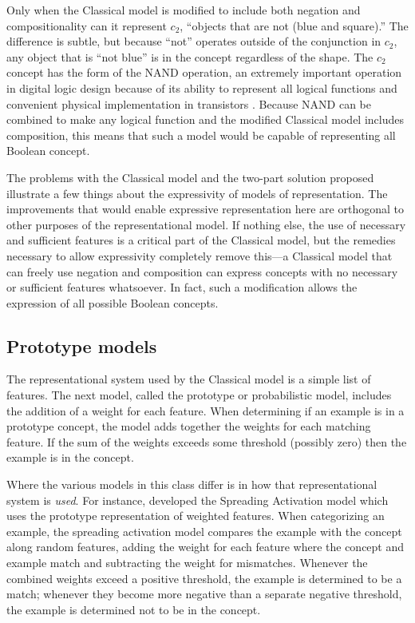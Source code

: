 \documentclass[doc,floatsintext]{apa6}
\begin{document}
Only when the Classical model is modified to include both negation and compositionality can it represent $c_2$, ``objects that are not (blue and square).''
The difference is subtle, but because ``not'' operates outside of the conjunction in $c_2$, any object that is ``not blue'' is in the concept regardless of the shape. 
The $c_2$ concept has the form of the NAND operation, an extremely important operation in digital logic design because of its ability to represent all logical functions and convenient physical implementation in transistors \citep{roth2013}.
Because NAND can be combined to make any logical function and the modified Classical model includes composition, this means that such a model would be capable of representing all Boolean concept.

The problems with the Classical model and the two-part solution proposed illustrate a few things about the expressivity of models of representation.
The improvements that would enable expressive representation here are orthogonal to other purposes of the representational model.
If nothing else, the use of necessary and sufficient features is a critical part of the Classical model, but the remedies necessary to allow expressivity completely remove this---a Classical model that can freely use negation and composition can express concepts with no necessary or sufficient features whatsoever. In fact, such a modification allows the expression of all possible Boolean concepts.


\subsection{Prototype models}



The representational system used by the Classical model is a simple list of features.
The next model, called the prototype or probabilistic model, includes the addition of a weight for each feature.
When determining if an example is in a prototype concept, the model adds together the weights for each matching feature.
If the sum of the weights exceeds some threshold (possibly zero) then the example is in the concept.

Where the various models in this class differ is in how that representational system is \emph{used}. For instance, \citet{collinsl1975} developed the Spreading Activation model which uses the prototype representation of weighted features. When categorizing an example, the spreading activation model compares the example with the concept along random features, adding the weight for each feature where the concept and example match and subtracting the weight for mismatches. Whenever the combined weights exceed a positive threshold, the example is determined to be a match; whenever they become more negative than a separate negative threshold, the example is determined not to be in the concept.
\end{document}
